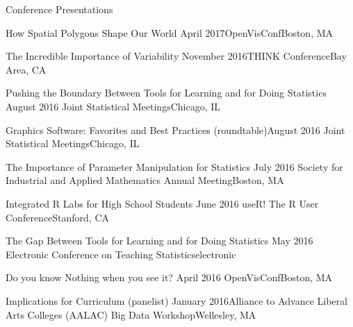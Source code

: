 \documentclass{resume} %
\begin{document}
\begin{rSection}{Conference Presentations}
\begin{sSubsection}{How Spatial Polygons Shape Our World}{ }{April 2017}{OpenVisConf}{Boston, MA}
\end{sSubsection}



\begin{sSubsection}{The Incredible Importance of Variability}{ }{November 2016}{THINK Conference}{Bay Area, CA}
\end{sSubsection}

\begin{sSubsection}{Pushing the Boundary Between Tools for Learning and for Doing Statistics}{ }{August 2016 }{Joint Statistical Meetings}{Chicago, IL}
\end{sSubsection}

\begin{sSubsection}{Graphics Software: Favorites and Best Practices}{ (roundtable)}{August 2016 }{Joint Statistical Meetings}{Chicago, IL}
\end{sSubsection}

\begin{sSubsection}{The Importance of Parameter Manipulation for Statistics}{ }{July 2016 }{Society for Industrial and Applied Mathematics Annual Meeting}{Boston, MA}
\end{sSubsection}

\begin{sSubsection}{Integrated R Labs for High School Students}{ }{June 2016 }{useR! The R User Conference}{Stanford, CA}
\end{sSubsection}

\begin{sSubsection}{The Gap Between Tools for Learning and for Doing Statistics}{ }{May 2016 }{Electronic Conference on Teaching Statistics}{electronic}
\end{sSubsection}

\begin{sSubsection}{Do you know Nothing when you see it?}{ }{April 2016 }{OpenVisConf}{Boston, MA}
\end{sSubsection}

\begin{sSubsection}{Implications for Curriculum}{ (panelist) }{January 2016}{Alliance to Advance Liberal Arts Colleges (AALAC) Big Data Workshop}{Wellesley, MA}
\end{sSubsection}


\end{rSection}
\end{document}
